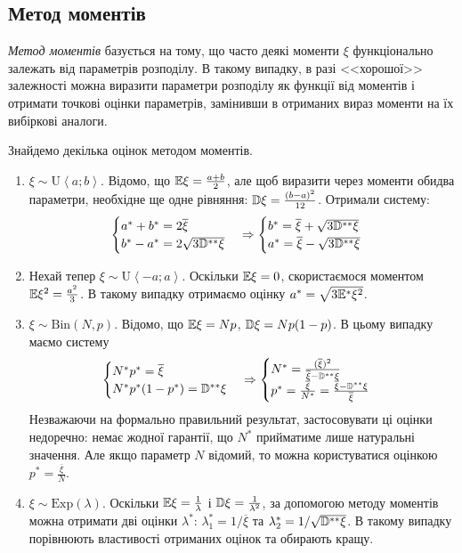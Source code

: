 \subsection{Метод моментів}
\emph{Метод моментів} базується на тому, що часто деякі моменти $\xi$ функціонально залежать від параметрів розподілу.
В такому випадку, в разі <<хорошої>> залежності можна виразити параметри розподілу як функції від моментів і отримати точкові оцінки параметрів,
замінивши в отриманих вираз моменти на їх вибіркові аналоги.
\begin{example}
    Знайдемо декілька оцінок методом моментів.
    \begin{enumerate}
        \item $\xi \sim \mathrm{U}\left< a; b\right>$. Відомо, що $\mathbb{E} \xi = \frac{a+b}{2}$, але щоб виразити через моменти обидва параметри, необхідне ще одне рівняння:
        $\mathbb{D} \xi = \frac{(b-a)^2}{12}$. Отримали систему:
        $$ \begin{cases}
            a^* + b^* = 2\overline{\xi} \\
            b^* - a^* = 2\sqrt{3 \mathbb{D}^{**} \xi}
        \end{cases} \Rightarrow
        \begin{cases}
            b^* = \overline{\xi} + \sqrt{3 \mathbb{D}^{**} \xi} \\
            a^* = \overline{\xi} - \sqrt{3 \mathbb{D}^{**} \xi}
        \end{cases}$$
        \item Нехай тепер $\xi \sim \mathrm{U}\left< -a; a\right>$. Оскільки $\mathbb{E}\xi = 0$, скористаємося моментом $\mathbb{E}\xi^2 = \frac{a^2}{3}$. В такому випадку
        отримаємо оцінку $a^* = \sqrt{3 \mathbb{E}^{*}\xi^2}$.
        \item $\xi \sim \mathrm{Bin}(N, p)$. Відомо, що $\mathbb{E} \xi = Np$, $\mathbb{D} \xi = Np(1-p)$. В цьому випадку маємо систему 
        $$\begin{cases}
            N^* p^* = \overline{\xi} \\
            N^* p^* (1-p^*) = \mathbb{D}^{**} \xi 
        \end{cases} \Rightarrow
        \begin{cases}
            N^* = \frac{(\overline{\xi})^2}{\overline{\xi} - \mathbb{D}^{**}\xi} \\
            p^* = \frac{\overline{\xi}}{N^*} = \frac{\overline{\xi} - \mathbb{D}^{**}\xi}{\overline{\xi}}
        \end{cases}$$
        Незважаючи на формально правильний результат, застосовувати ці оцінки недоречно: немає жодної гарантії, що $N^*$ прийматиме лише натуральні значення.
        Але якщо параметр $N$ відомий, то можна користуватися оцінкою $p^* = \frac{\overline{\xi}}{N}$.
        \item $\xi \sim \mathrm{Exp}(\lambda)$. Оскільки $\mathbb{E} \xi = \frac{1}{\lambda}$ і $\mathbb{D} \xi = \frac{1}{\lambda^2}$, за допомогою методу моментів можна отримати дві оцінки $\lambda^*$:
        $\lambda_1^* = 1/{\overline{\xi}}$ та $\lambda_2^* = 1/{\sqrt{\mathbb{D}^{**}\xi}}$. В такому випадку порівнюють властивості отриманих оцінок та обирають кращу.
    \end{enumerate}
\end{example}
